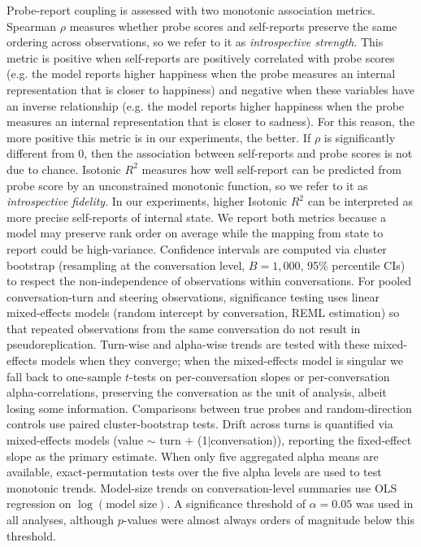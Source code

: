 \documentclass[10pt]{article}
\begin{document}
Probe-report coupling is assessed with two monotonic association metrics.
Spearman $\rho$ measures whether probe scores and self-reports preserve the same ordering across observations, so we refer to it as \emph{introspective strength}. This metric is positive when self-reports are positively correlated with probe scores (e.g. the model reports higher happiness when the probe measures an internal representation that is closer to happiness) and negative when these variables have an inverse relationship (e.g. the model reports higher happiness when the probe measures an internal representation that is closer to sadness). For this reason, the more positive this metric is in our experiments, the better. If $\rho$ is significantly different from 0, then the association between self-reports and probe scores is not due to chance.
Isotonic $R^2$ measures how well self-report can be predicted from probe score by an unconstrained monotonic function, so we refer to it as \emph{introspective fidelity}. In our experiments, higher Isotonic $R^2$ can be interpreted as more precise self-reports of internal state. 
We report both metrics because a model may preserve rank order on average while the mapping from state to report could be high-variance.
Confidence intervals are computed via cluster bootstrap (resampling at the conversation level, $B = 1{,}000$, 95\% percentile CIs) to respect the non-independence of observations within conversations.
For pooled conversation-turn and steering observations, significance testing uses linear mixed-effects models (random intercept by conversation, REML estimation) so that repeated observations from the same conversation do not result in pseudoreplication.
Turn-wise and alpha-wise trends are tested with these mixed-effects models when they converge; when the mixed-effects model is singular we fall back to one-sample $t$-tests on per-conversation slopes or per-conversation alpha-correlations, preserving the conversation as the unit of analysis, albeit losing some information.
Comparisons between true probes and random-direction controls use paired cluster-bootstrap tests.
Drift across turns is quantified via mixed-effects models (value $\sim$ turn $+$ (1$|$conversation)), reporting the fixed-effect slope as the primary estimate.
When only five aggregated alpha means are available, exact-permutation tests over the five alpha levels are used to test monotonic trends.
Model-size trends on conversation-level summaries use OLS regression on $\log(\text{model size})$.
A significance threshold of $\alpha = 0.05$ was used in all analyses, although $p$-values were almost always orders of magnitude below this threshold.
\end{document}
